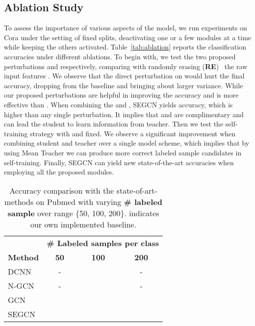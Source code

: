 \documentclass[letterpaper]{article} \usepackage{aaai19}  \usepackage{times}  \usepackage{helvet}  \usepackage{courier}  \usepackage{url}  \usepackage{graphicx}  \usepackage{algorithm}
\begin{document}
\subsection{Ablation Study}
To assess the importance of various aspects of the model, we run experiments on Cora under the setting of fixed splits, deactivating one or a few modules at a time while keeping the others activated. Table~\ref{tab:ablation} reports the classification accuracies under different ablations. To begin with, we test the two proposed perturbations  and  respectively, comparing with randomly erasing (\textbf{RE})~\cite{zhong2017random} the raw input features . We observe that the direct perturbation on  would hurt the final accuracy, dropping  from the baseline and bringing about larger variance. While our proposed perturbations are helpful in improving the accuracy and  is more effective than . When combining the  and , SEGCN yields  accuracy, which is higher than any single perturbation. It implies that  and  are complimentary and can lead the student to learn information from teacher. Then we test the self-training strategy with  and  fixed. We observe a significant improvement when combining student and teacher over a single model scheme, which implies that by using Mean Teacher we can produce more correct labeled sample candidates in self-training. Finally, SEGCN can yield new state-of-the-art accuracies when employing all the proposed modules. 

\begin{table}[t]
\caption{Accuracy comparison with the state-of-art-methods on Pubmed with varying \textbf{\# labeled sample} over range \{50, 100, 200\}.  indicates our own implemented baseline.}
\label{tab:pubmed}
\vspace{0.1cm}
\centering
\begin{tabular}{l|ccc}
\hline
& \multicolumn{3}{c}{\textbf{\# Labeled samples per class}}\\
\textbf{Method}  & \textbf{50} & \textbf{100} & \textbf{200}\\ \hline
DCNN	& -							&  			& - \\
N-GCN	& -							&  			& - \\
GCN	& 			&  			&  \\
SEGCN	&  	&  	&  \\
\hline
\end{tabular}
\end{table}
 
\end{document}
